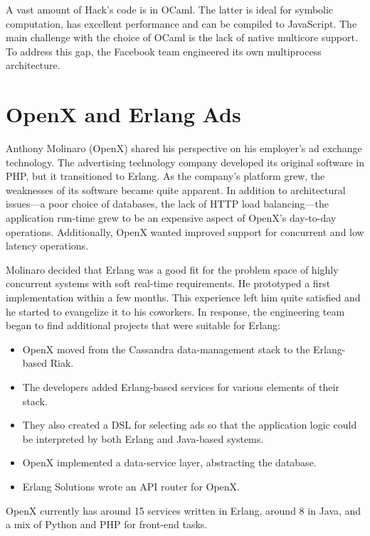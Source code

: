 \documentclass{jfp1}
\begin{document}
A vast amount of Hack's code is in OCaml. The latter is ideal for symbolic
computation, has excellent performance and can be compiled to JavaScript.
The main challenge with the choice of OCaml is the lack of native
multicore support. To address this gap, the Facebook team engineered its
own multiprocess architecture.

\section{OpenX and Erlang Ads}


Anthony Molinaro (OpenX) shared his perspective on his employer's ad
exchange technology.  The advertising technology company developed its
original software in PHP, but it transitioned to Erlang.  As the company's
platform grew, the weaknesses of its software became quite apparent. In
addition to architectural issues---a poor choice of databases, the lack of
HTTP load balancing---the application run-time grew to be an expensive
aspect of OpenX's day-to-day operations. Additionally, OpenX wanted
improved support for concurrent and low latency operations.

Molinaro decided that Erlang was a good fit for the problem space of
highly concurrent systems with soft real-time requirements. He prototyped
a first implementation within a few months. This experience left him quite
satisfied and he started to evangelize it to his coworkers.  In response,
the engineering team began to find additional projects that were suitable
for Erlang:
\begin{itemize}

\item OpenX moved from the Cassandra data-management stack to the
Erlang-based Riak.

\item The developers added Erlang-based services for various elements of
their stack.

\item They also created a DSL for selecting ads so that the application
logic could be interpreted by both Erlang and Java-based systems.

\item OpenX implemented a data-service layer, abstracting the database.

\item Erlang Solutions wrote an API router for OpenX.
\end{itemize}
%
OpenX currently has around 15 services written in Erlang, around 8 in
Java, and a mix of Python and PHP for front-end tasks.
\end{document}
